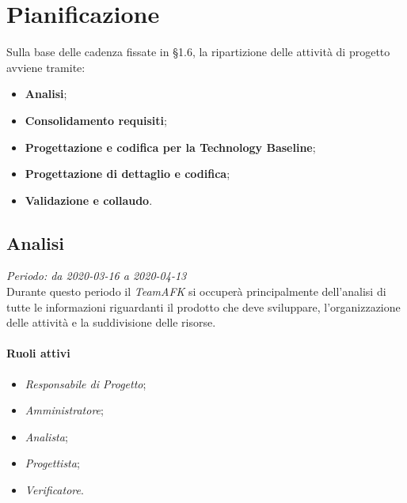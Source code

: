 \section{Pianificazione}
Sulla base delle cadenza fissate in §1.6, la ripartizione delle attività di progetto avviene tramite:
\begin{itemize}
\item \textbf{Analisi};
\item \textbf{Consolidamento requisiti};
\item \textbf{Progettazione e codifica per la Technology Baseline};
\item \textbf{Progettazione di dettaglio e codifica};
\item \textbf{Validazione e collaudo}.
\end{itemize}  

\subsection{Analisi}
\textit{Periodo: da 2020-03-16 a 2020-04-13} \\
Durante questo periodo il \textit{TeamAFK} si occuperà principalmente dell’analisi di tutte le informazioni riguardanti il prodotto che deve sviluppare, l’organizzazione delle attività e la suddivisione delle risorse.

\paragraph{Ruoli attivi} 
\begin{itemize}
\item \textit{Responsabile di Progetto};
\item \textit{Amministratore};
\item \textit{Analista};
\item \textit{Progettista};
\item \textit{Verificatore}.
\end{itemize}

